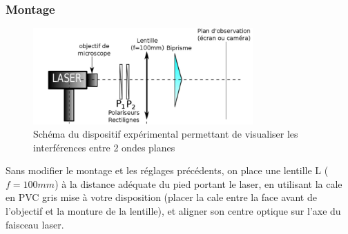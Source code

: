 \documentclass[11pt, a4paper]{article}
\begin{document}
    \subsubsection{Montage}
    \begin{figure}[htbp] %
        \centering %
        \includegraphics[width=0.75\textwidth]{schema2} %
        \caption{Schéma du dispositif expérimental permettant de visualiser les interférences entre 2 ondes planes} %
        \label{schema2}%
    \end{figure}
    Sans modifier le montage et les réglages précédents, on place une lentille L ($f=100 mm$) à la distance adéquate du pied portant le laser, en utilisant la cale en PVC gris mise à votre disposition (placer la cale entre la face avant de l’objectif et la monture de la lentille), et aligner son centre optique sur l’axe du faisceau laser.
    
\end{document}
